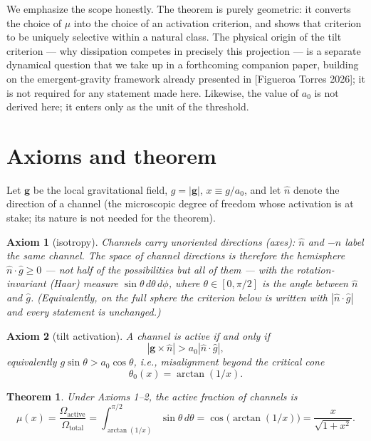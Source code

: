 \documentclass[11pt]{article}
\newtheorem{axiom}{Axiom}
\newtheorem*{theorem*}{Theorem}
\theoremstyle{plain}
\begin{document}
We emphasize the scope honestly. The theorem is purely geometric: it converts the choice of $\mu$ into the choice of an activation criterion, and shows that criterion to be uniquely selective within a natural class. The physical origin of the tilt criterion --- why dissipation competes in precisely this projection --- is a separate dynamical question that we take up in a forthcoming companion paper, building on the emergent-gravity framework already presented in [Figueroa Torres 2026]; it is not required for any statement made here. Likewise, the value of $a_0$ is not derived here; it enters only as the unit of the threshold.

\section{Axioms and theorem}\label{sec:theorem}

Let $\mathbf{g}$ be the local gravitational field, $g=|\mathbf{g}|$, $x\equiv g/a_0$, and let $\hat n$ denote the direction of a channel (the microscopic degree of freedom whose activation is at stake; its nature is not needed for the theorem).

\begin{axiom}[isotropy]
Channels carry unoriented directions (axes): $\hat n$ and $-\hat n$ label the same channel. The space of channel directions is therefore the hemisphere $\hat n\cdot\hat g\geq 0$ --- not half of the possibilities but all of them --- with the rotation-invariant (Haar) measure $\sin\theta\,d\theta\,d\phi$, where $\theta\in[0,\pi/2]$ is the angle between $\hat n$ and $\hat g$. (Equivalently, on the full sphere the criterion below is written with $|\hat n\cdot\hat g|$ and every statement is unchanged.)
\end{axiom}

\begin{axiom}[tilt activation]
A channel is active if and only if
\begin{equation*}\tag{1}\label{eq:1}
|\mathbf{g}\times\hat n| > a_0|\hat n\cdot\hat g|,
\end{equation*}
equivalently $g\sin\theta > a_0\cos\theta$, i.e., misalignment beyond the critical cone
\begin{equation*}\tag{2}\label{eq:2}
\theta_0(x) = \arctan(1/x).
\end{equation*}
\end{axiom}

\begin{theorem*}
Under Axioms 1--2, the active fraction of channels is
\begin{equation*}\tag{3}\label{eq:3}
\mu(x) = \frac{\Omega_{\text{active}}}{\Omega_{\text{total}}} = \int_{\arctan(1/x)}^{\pi/2}\sin\theta\,d\theta = \cos\big(\arctan(1/x)\big) = \frac{x}{\sqrt{1+x^2}}.
\end{equation*}
\end{theorem*}
\end{document}
